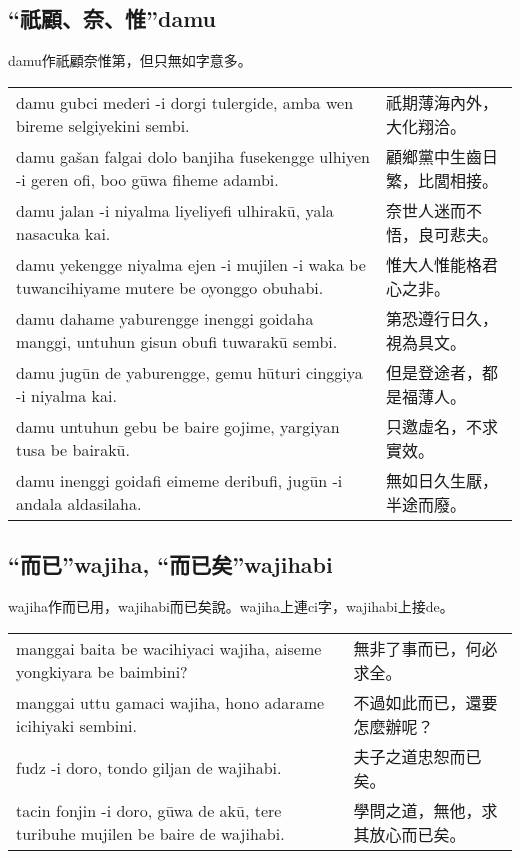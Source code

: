 \documentclass{article}
\begin{document}
\subsection{“祇顧、奈、惟”damu}
\noindent damu作祇顧奈惟第，但只無如字意多。
\begin{center}
    \begin{tabularx}{\textwidth}{XX}
        damu gubci mederi -i dorgi tulergide, amba wen bireme selgiyekini sembi. & 祇期薄海內外，大化翔洽。\\
        damu ga\v{s}an falgai dolo banjiha fusekengge ulhiyen -i geren ofi, boo g\={u}wa fiheme adambi. & 顧鄉黨中生齒日繁，比閭相接。\\
        damu jalan -i niyalma liyeliyefi ulhirak\={u}, yala nasacuka kai. & 奈世人迷而不悟，良可悲夫。\\
        damu yekengge niyalma ejen -i mujilen -i waka be tuwancihiyame mutere be oyonggo obuhabi. & 惟大人惟能格君心之非。\\
        damu dahame yaburengge inenggi goidaha manggi, untuhun gisun obufi tuwarak\={u} sembi. & 第恐遵行日久，視為具文。\\
        damu jug\={u}n de yaburengge, gemu h\={u}turi cinggiya -i niyalma kai. & 但是登途者，都是福薄人。\\
        damu untuhun gebu be baire gojime, yargiyan tusa be bairak\={u}. & 只邀虛名，不求實效。\\
        damu inenggi goidafi eimeme deribufi, jug\={u}n -i andala aldasilaha. & 無如日久生厭，半途而廢。
    \end{tabularx}
\end{center}

\subsection{“而已”wajiha, “而已矣”wajihabi}
\noindent wajiha作而已用，wajihabi而已矣說。wajiha上連ci字，wajihabi上接de。
\begin{center}
    \begin{tabularx}{\textwidth}{XX}
        manggai baita be wacihiyaci wajiha, aiseme yongkiyara be baimbini? & 無非了事而已，何必求全。\\
        manggai uttu gamaci wajiha, hono adarame icihiyaki sembini. & 不過如此而已，還要怎麼辦呢？\\
        fudz -i doro, tondo giljan de wajihabi. & 夫子之道忠恕而已矣。\\
        tacin fonjin -i doro, g\={u}wa de ak\={u}, tere turibuhe mujilen be baire de wajihabi. & 學問之道，無他，求其放心而已矣。
    \end{tabularx}
\end{center}
\end{document}
